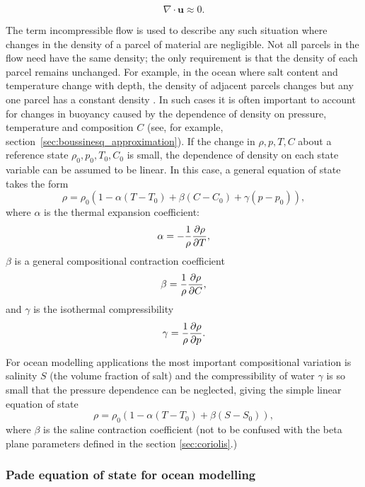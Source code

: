 \begin{equation}\label{eq:divfree}
\nabla\cdot\mathbf{u}\approx 0.
\end{equation}

The term incompressible flow is used to describe any such situation where
changes in the density of a parcel of material are negligible.  Not all
parcels in the flow need have the same density; the only requirement is that
the density of each parcel remains unchanged.  For example, in the ocean
where salt content and temperature change with depth, the density of
adjacent parcels changes but any one parcel has a constant density
\cite{panton2006}.  In such cases it is often important to account for
changes in buoyancy caused by the dependence of density on pressure,
temperature and composition $C$ (see, for example,
section~\ref{sec:boussinesq_approximation}).  If the change in $\rho,p,T,C$
about a reference state $\rho_0,p_0,T_0,C_0$ is small, the dependence of
density on each state variable can be assumed to be linear.  In this case, a
general equation of state takes the form
\begin{equation}
\rho = \rho_0(1 - \alpha(T-T_0) + \beta(C-C_0) + \gamma(p-p_0)),
\end{equation}
where $\alpha$ is the thermal expansion coefficient:
\begin{equation*}
\alpha = -\frac{1}{\rho}\frac{\partial\rho}{\partial T},
\end{equation*}
$\beta$ is a general compositional contraction coefficient
\begin{equation}
\beta = \frac{1}{\rho}\frac{\partial\rho}{\partial C},
\end{equation}
and $\gamma$ is the isothermal compressibility
\begin{equation}
\gamma = \frac{1}{\rho}\frac{\partial\rho}{\partial p}.
\end{equation}

For ocean modelling applications the most important compositional variation is salinity $S$ (the volume fraction of salt) and the compressibility of water $\gamma$ is so small that the pressure dependence can be neglected, giving the simple linear equation of state
\begin{equation}
\rho = \rho_0(1 - \alpha(T-T_0) + \beta(S-S_0)),
\end{equation}
where $\beta$ is the saline contraction coefficient (not to be confused with the beta plane parameters defined in the section \ref{sec:coriolis}.)

\subsubsection{Pade equation of state for ocean modelling}\label{sec:PadeDescription}

